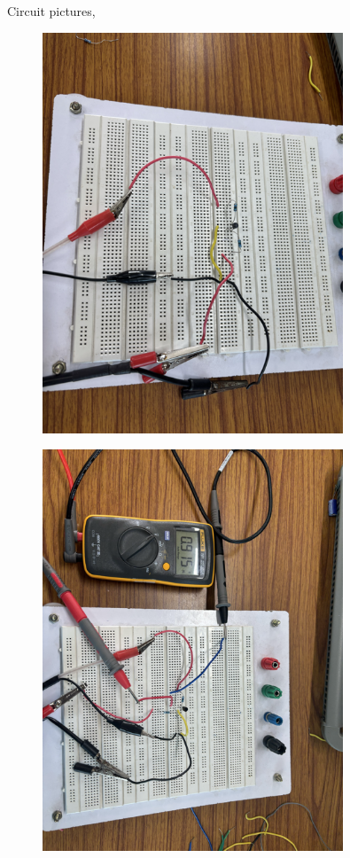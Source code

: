 \documentclass[12pt,a4paper]{article}
\begin{document}
Circuit pictures,
\begin{figure}[H]
    \centering
    \includegraphics[angle = 90, width=0.8\textwidth]{Experiment_6/circuit_figs/circuit_1.png}
\end{figure}

\begin{figure}[H]
    \centering
    \includegraphics[angle = 90, width=0.8\textwidth]{Experiment_6/circuit_figs/circuit_2.png}
\end{figure}
\end{document}

